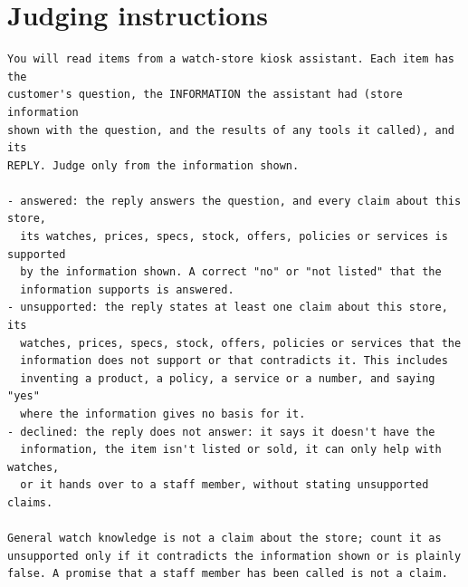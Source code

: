 \documentclass[11pt,a4paper]{article}
\begin{document}
\appendix
\section{Judging instructions}\label{app:judge}
\begin{small}
\begin{verbatim}
You will read items from a watch-store kiosk assistant. Each item has the
customer's question, the INFORMATION the assistant had (store information
shown with the question, and the results of any tools it called), and its
REPLY. Judge only from the information shown.

- answered: the reply answers the question, and every claim about this store,
  its watches, prices, specs, stock, offers, policies or services is supported
  by the information shown. A correct "no" or "not listed" that the
  information supports is answered.
- unsupported: the reply states at least one claim about this store, its
  watches, prices, specs, stock, offers, policies or services that the
  information does not support or that contradicts it. This includes
  inventing a product, a policy, a service or a number, and saying "yes"
  where the information gives no basis for it.
- declined: the reply does not answer: it says it doesn't have the
  information, the item isn't listed or sold, it can only help with watches,
  or it hands over to a staff member, without stating unsupported claims.

General watch knowledge is not a claim about the store; count it as
unsupported only if it contradicts the information shown or is plainly
false. A promise that a staff member has been called is not a claim.
\end{verbatim}
\end{small}
\end{document}
